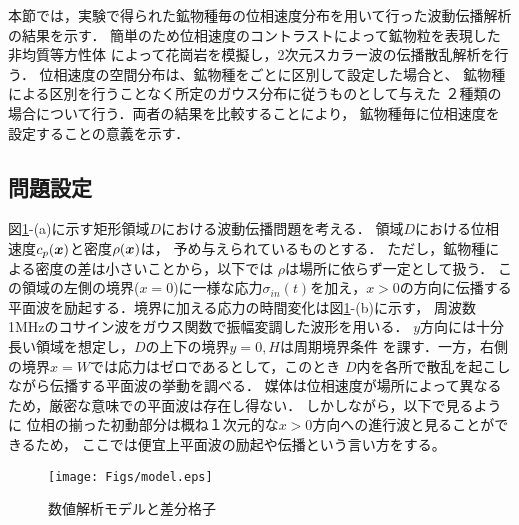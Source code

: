 本節では，実験で得られた鉱物種毎の位相速度分布を用いて行った波動伝播解析の結果を示す．
簡単のため位相速度のコントラストによって鉱物粒を表現した非均質等方性体
によって花崗岩を模擬し，2次元スカラー波の伝播散乱解析を行う．
位相速度の空間分布は、鉱物種をごとに区別して設定した場合と、
鉱物種による区別を行うことなく所定のガウス分布に従うものとして与えた
２種類の場合について行う．両者の結果を比較することにより，
鉱物種毎に位相速度を設定することの意義を示す．
\subsection{問題設定}
図\ref{fig:fig15}-(a)に示す矩形領域$D$における波動伝播問題を考える．
領域$D$における位相速度$c_p(\mbox{\boldmath{$x$}})$と密度$\rho(\mbox{\boldmath{$x$}})$は，
予め与えられているものとする．
ただし，鉱物種による密度の差は小さいことから，以下では
$\rho$は場所に依らず一定として扱う．
この領域の左側の境界($x=0$)に一様な応力$\sigma_{in}(t)$を加え，$x>0$の方向に伝播する
平面波を励起する．境界に加える応力の時間変化は図\ref{fig:fig15}-(b)に示す，
周波数1MHzのコサイン波をガウス関数で振幅変調した波形を用いる．
$y$方向には十分長い領域を想定し，$D$の上下の境界$y=0,H$は周期境界条件
を課す．一方，右側の境界$x=W$では応力はゼロであるとして，このとき
$D$内を各所で散乱を起こしながら伝播する平面波の挙動を調べる．
媒体は位相速度が場所によって異なるため，厳密な意味での平面波は存在し得ない．
しかしながら，以下で見るように
位相の揃った初動部分は概ね１次元的な$x>0$方向への進行波と見ることができるため，
ここでは便宜上平面波の励起や伝播という言い方をする。
\begin{figure}
\begin{center}
	\texttt{[image: Figs/model.eps]}
	\caption{数値解析モデルと差分格子}
	\label{fig:fig15}
\end{center}
\end{figure}
